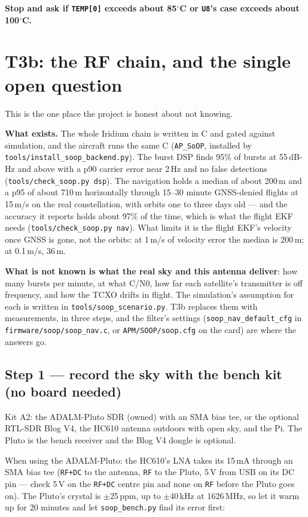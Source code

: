 \documentclass[11pt,a4paper]{article}
\newcommand{\file}[1]{\texttt{\small #1}}
\newcommand{\degC}{$^\circ$C}
\begin{document}
\textbf{Stop and ask if \file{TEMP[0]} exceeds about 85\degC{} or \file{U8}'s case exceeds
about 100\degC.}

\section{T3b: the RF chain, and the single open question}

This is the one place the project is honest about not knowing.

\textbf{What exists.} The whole Iridium chain is written in C and gated against simulation,
and the aircraft runs the same C (\file{AP\_SoOP}, installed by
\file{tools/install\_soop\_backend.py}). The burst DSP finds 95\% of bursts at 55\,dB-Hz and
above with a p90 carrier error near 2\,Hz and no false detections
(\file{tools/check\_soop.py dsp}). The navigation holds a median of about 200\,m and a p95
of about 710\,m horizontally through 15--30 minute GNSS-denied flights at 15\,m/s on the real
constellation, with orbits one to three days old --- and the accuracy it reports holds about
97\% of the time, which is what the flight EKF needs (\file{tools/check\_soop.py nav}).
What limits it is the flight EKF's velocity once GNSS is gone, not the orbits: at 1\,m/s of
velocity error the median is 200\,m; at 0.1\,m/s, 36\,m.

\textbf{What is not known is what the real sky and this antenna deliver}: how many bursts
per minute, at what C/N0, how far each satellite's transmitter is off frequency, and how
the TCXO drifts in flight. The simulation's assumption for each is written in
\file{tools/soop\_scenario.py}. T3b replaces them with measurements, in three steps, and the
filter's settings (\file{soop\_nav\_default\_cfg} in \file{firmware/soop/soop\_nav.c}, or
\file{APM/SOOP/soop.cfg} on the card) are where the answers go.

\subsection{Step 1 --- record the sky with the bench kit (no board needed)}

Kit A2: the ADALM-Pluto SDR (owned) with an SMA bias tee, or the optional RTL-SDR Blog V4,
the HC610 antenna outdoors with open sky, and the Pi. The Pluto is the bench receiver and
the Blog V4 dongle is optional.

When using the ADALM-Pluto: the HC610's LNA takes its 15\,mA through an SMA bias tee
(\file{RF+DC} to the antenna, \file{RF} to the Pluto, 5\,V from USB on its DC pin --- check
5\,V on the \file{RF+DC} centre pin and none on \file{RF} before the Pluto goes on). The
Pluto's crystal is $\pm$25\,ppm, up to $\pm$40\,kHz at 1626\,MHz, so let it warm up for
20 minutes and let \file{soop\_bench.py} find its error first:
\end{document}
